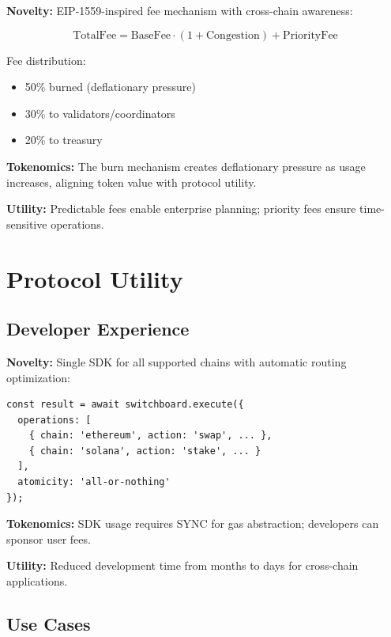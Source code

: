\documentclass[12pt,a4paper]{article}
\begin{document}
\textbf{Novelty:} EIP-1559-inspired fee mechanism with cross-chain awareness:

\begin{equation}
\text{TotalFee} = \text{BaseFee} \cdot (1 + \text{Congestion}) + \text{PriorityFee}
\end{equation}

Fee distribution:
\begin{itemize}
    \item 50\% burned (deflationary pressure)
    \item 30\% to validators/coordinators
    \item 20\% to treasury
\end{itemize}

\textbf{Tokenomics:} The burn mechanism creates deflationary pressure as usage increases, aligning token value with protocol utility.

\textbf{Utility:} Predictable fees enable enterprise planning; priority fees ensure time-sensitive operations.

\section{Protocol Utility}

\subsection{Developer Experience}

\textbf{Novelty:} Single SDK for all supported chains with automatic routing optimization:

\begin{verbatim}
const result = await switchboard.execute({
  operations: [
    { chain: 'ethereum', action: 'swap', ... },
    { chain: 'solana', action: 'stake', ... }
  ],
  atomicity: 'all-or-nothing'
});
\end{verbatim}

\textbf{Tokenomics:} SDK usage requires SYNC for gas abstraction; developers can sponsor user fees.

\textbf{Utility:} Reduced development time from months to days for cross-chain applications.

\subsection{Use Cases}
\end{document}

